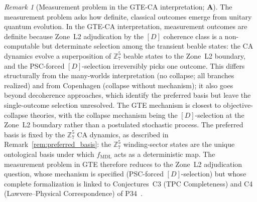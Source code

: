 \documentclass[11pt]{article}
\theoremstyle{remark}
\newtheorem{remark}[theorem]{Remark}
\newcommand{\MDL}{\text{MDL}}
\newcommand{\CatA}{\textbf{A}}
\begin{document}
\begin{remark}[Measurement problem in the GTE-CA interpretation; $\CatA$]
\label{rem:measurement_problem}
The measurement problem asks how definite, classical outcomes emerge from unitary quantum
evolution.
In the GTE-CA interpretation, measurement outcomes are definite because Zone~L2
adjudication by the $[D]$ coherence class is a non-computable but determinate selection
among the transient beable states: the CA dynamics evolve a superposition of
$\mathbb{Z}_7^5$ beable states to the Zone~L2 boundary, and the PSC-forced
$[D]$-selection irreversibly picks one outcome.
This differs structurally from the many-worlds interpretation (no collapse; all branches
realized) and from Copenhagen (collapse without mechanism); it also goes beyond
decoherence approaches, which identify the preferred basis but leave the single-outcome
selection unresolved.
The GTE mechanism is closest to objective-collapse theories, with the collapse mechanism
being the $[D]$-selection at the Zone~L2 boundary rather than a postulated stochastic
process.
The preferred basis is fixed by the $\mathbb{Z}_7^5$ CA dynamics, as described in
Remark~\ref{rem:preferred_basis}: the $\mathbb{Z}_7^5$ winding-sector states are the
unique ontological basis under which $f_{\MDL}$ acts as a deterministic map.
The measurement problem in GTE therefore reduces to the Zone~L2 adjudication question,
whose mechanism is specified (PSC-forced $[D]$-selection) but whose complete
formalization is linked to Conjectures~C3 (TPC Completeness) and C4 (Lawvere--Physical Correspondence) of P34~\cite{SpivackGTEMobius}.
\end{remark}
\end{document}
